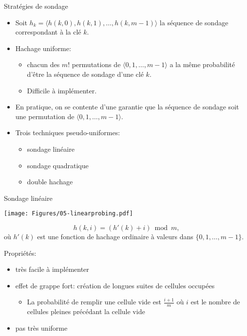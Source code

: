 \begin{frame}{Stratégies de sondage}
\begin{itemize}
\item Soit $h_k=\langle h(k,0), h(k,1), \ldots, h(k,m-1)\rangle$ la séquence de sondage correspondant à la clé $k$.
\item Hachage uniforme:
\begin{itemize}
\item chacun des $m!$ permutations de $\langle
  0,1,\ldots,m-1\rangle$ a la même probabilité d'être la séquence de
  sondage d'une clé $k$.
\item Difficile à implémenter.
\end{itemize}
\item En pratique, on se contente d'une garantie que la séquence de
  sondage soit une permutation de $\langle
  0,1,\ldots,m-1\rangle$.

\bigskip

\item Trois techniques pseudo-uniformes:
\begin{itemize}
\item sondage linéaire
\item sondage quadratique
\item double hachage
\end{itemize}
\end{itemize}

\end{frame}

\begin{frame}{Sondage linéaire}

\centerline{\texttt{[image: Figures/05-linearprobing.pdf]}}

\bigskip

$$h(k,i)=(h'(k)+i) \bmod m,$$
où $h'(k)$ est une fonction de hachage ordinaire à valeurs dans $\{0,1,\ldots,m-1\}$.


Propriétés:
\begin{itemize}
\item très facile à implémenter
\item effet de grappe fort: création de longues suites de cellules occupées
\begin{itemize}
\item La probabilité de remplir une cellule vide est $\frac{i+1}{m}$ où $i$ est le nombre de cellules pleines précédant la cellule vide
\end{itemize}
\item pas très uniforme
\end{itemize}


\end{frame}

